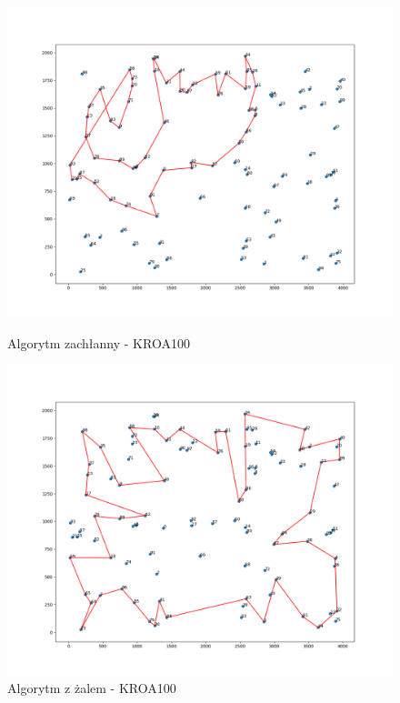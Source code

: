 \documentclass{article}
\begin{document}
\begin{figure}[h!]
  \centering
  \begin{minipage}[b]{0.8\textwidth}
    \includegraphics[width=\textwidth]{kroa_greedypng.png}
    \caption{Algorytm zachłanny - KROA100}
  \end{minipage}

  \begin{minipage}[b]{0.8\textwidth}
    \includegraphics[width=\textwidth]{kroa_min_regret_18679.png}
    \caption{Algorytm z żalem - KROA100}
  \end{minipage}
  
\end{figure}
    
\end{document}
